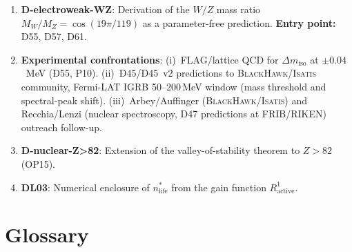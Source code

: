 \documentclass[11pt,a4paper]{article}
\theoremstyle{plain}
\theoremstyle{definition}
\theoremstyle{remark}
\begin{document}
\begin{enumerate}
\item \textbf{D-electroweak-WZ}: Derivation of the $W/Z$ mass ratio $M_W/M_Z = \cos(19\pi/119)$ as a parameter-free prediction. \textbf{Entry point:} D55, D57, D61.
\item \textbf{Experimental confrontations}: (i)~FLAG/lattice QCD for $\Delta m_{\mathrm{iso}}$ at $\pm 0.04$~MeV (D55, P10). (ii)~D45/D45~v2 predictions to \textsc{BlackHawk}/\textsc{Isatis} community, Fermi-LAT IGRB 50--200\,MeV window (mass threshold and spectral-peak shift). (iii)~Arbey/Auffinger (\textsc{BlackHawk}/\textsc{Isatis}) and Recchia/Lenzi (nuclear spectroscopy, D47 predictions at FRIB/RIKEN) outreach follow-up.
\item \textbf{D-nuclear-Z>82}: Extension of the valley-of-stability theorem to $Z>82$ (OP15).
\item \textbf{DL03}: Numerical enclosure of $n^*_{\mathrm{life}}$ from the gain function $R^1_{\mathrm{active}}$.
\end{enumerate}

\section{Glossary}
\label{sec:glossary}
\end{document}
